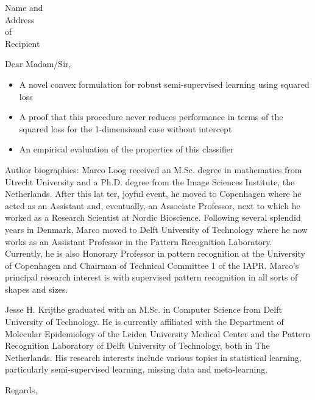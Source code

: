 \documentclass[fontsize=12pt, paper=a4]{scrlttr2}
\begin{document}
\begin{letter}{Name and \\ Address \\ of \\ Recipient}

\opening{Dear Madam/Sir,}  %

\begin{itemize}
  \item A novel convex formulation for robust semi-supervised learning using squared loss 
  \item A proof that this procedure never reduces performance in terms of the squared loss for the 1-dimensional case without intercept
  \item An empirical evaluation of the properties of this classifier
\end{itemize}

Author biographies:
Marco Loog received an M.Sc. degree in mathematics from Utrecht University and a Ph.D. degree from the Image Sciences Institute, the Netherlands. After this lat
ter, joyful event, he moved to Copenhagen where he acted as an Assistant and, eventually, an Associate Professor, next to which he worked as a Research Scientist at Nordic Bioscience. Following several splendid years in Denmark, Marco moved to Delft University of Technology where he now works as an Assistant Professor in the Pattern Recognition Laboratory. Currently, he is also Honorary Professor in pattern recognition at the University of Copenhagen and Chairman of Technical Committee 1 of the IAPR. Marco's principal research interest is with supervised pattern recognition in all sorts of shapes and sizes.

Jesse H. Krijthe graduated with an M.Sc. in Computer Science from Delft University of Technology. He is currently affiliated with the Department of Molecular Epidemiology of the Leiden University Medical Center and the Pattern Recognition Laboratory of Delft University of Technology, both in The Netherlands. His research interests include various topics in statistical learning, particularly semi-supervised learning, missing data and meta-learning.
\closing{Regards,} %

\end{letter}
\end{document}
